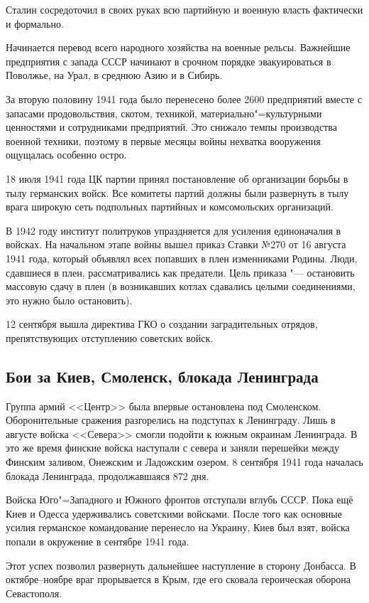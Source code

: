 Сталин сосредоточил в своих руках всю партийную и военную власть фактически и формально.

Начинается перевод всего народного хозяйства на военные рельсы. Важнейшие предприятия с запада СССР начинают в срочном порядке эвакуироваться в Поволжье, на Урал, в среднюю Азию и в Сибирь.

За вторую половину 1941 года было перенесено более 2600 предприятий вместе с запасами продовольствия, скотом, техникой, материально"=культурными ценностями и сотрудниками предприятий. Это снижало темпы производства военной техники, поэтому в первые месяцы войны нехватка вооружения ощущалась особенно остро.

18 июля 1941 года ЦК партии принял постановление об организации борьбы в тылу германских войск. Все комитеты партий должны были развернуть в тылу врага широкую сеть подпольных партийных и комсомольских организаций.

В 1942 году институт политруков упраздняется для усиления единоначалия в войсках. На начальном этапе войны вышел приказ Ставки №270 от 16 августа 1941 года, который объявлял всех попавших в плен изменниками Родины. Люди, сдавшиеся в плен, рассматривались как предатели. Цель приказа "--- остановить массовую сдачу в плен (в возникавших котлах сдавались целыми соединениями, это нужно было остановить).

12 сентября вышла директива ГКО о создании заградительных отрядов, препятствующих отступлению советских войск.
\subsection{Бои за Киев, Смоленск, блокада Ленинграда}
Группа армий <<Центр>> была впервые остановлена под Смоленском. Оборонительные сражения разгорелись на подступах к Ленинграду. Лишь в августе войска <<Севера>> смогли подойти к южным окраинам Ленинграда. В это же время финские войска наступали с севера и заняли перешейки между Финским заливом, Онежским и Ладожским озером. 8 сентября 1941 года началась блокада Ленинграда, продолжавшаяся 872 дня.

Войска Юго"=Западного и Южного фронтов отступали вглубь СССР. Пока ещё Киев и Одесса удерживались советскими войсками. После того как основные усилия германское командование перенесло на Украину, Киев был взят, войска попали в окружение в сентябре 1941 года.

Этот успех позволил развернуть дальнейшее наступление в сторону Донбасса. В октябре--ноябре враг прорывается в Крым, где его сковала героическая оборона Севастополя.

